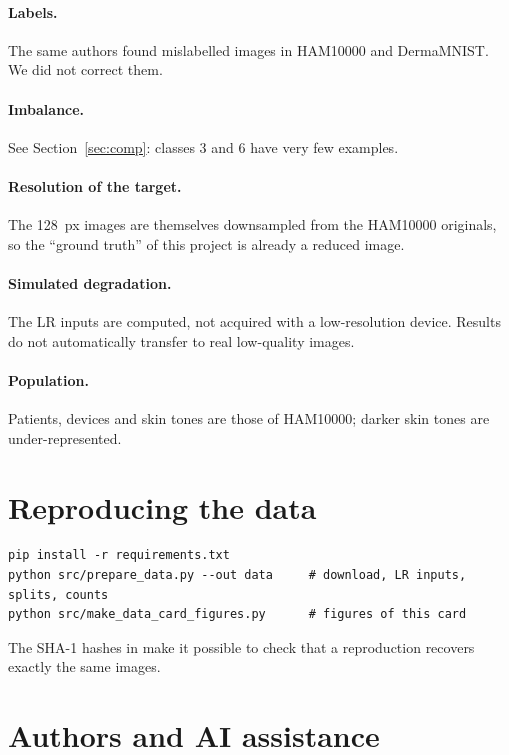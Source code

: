 \documentclass[11pt,a4paper]{article}
\begin{document}
\paragraph{Labels.} The same authors found mislabelled images in HAM10000 and DermaMNIST. We did
not correct them.

\paragraph{Imbalance.} See Section~\ref{sec:comp}: classes 3 and 6 have very few examples.

\paragraph{Resolution of the target.} The 128~px images are themselves downsampled from the
HAM10000 originals, so the ``ground truth'' of this project is already a reduced image.

\paragraph{Simulated degradation.} The LR inputs are computed, not acquired with a low-resolution
device. Results do not automatically transfer to real low-quality images.

\paragraph{Population.} Patients, devices and skin tones are those of HAM10000; darker skin tones
are under-represented.

\section{Reproducing the data}

\begin{verbatim}
pip install -r requirements.txt
python src/prepare_data.py --out data     # download, LR inputs, splits, counts
python src/make_data_card_figures.py      # figures of this card
\end{verbatim}
The SHA-1 hashes in  make it possible to check that a reproduction recovers
exactly the same images.

\section{Authors and AI assistance}
\end{document}
